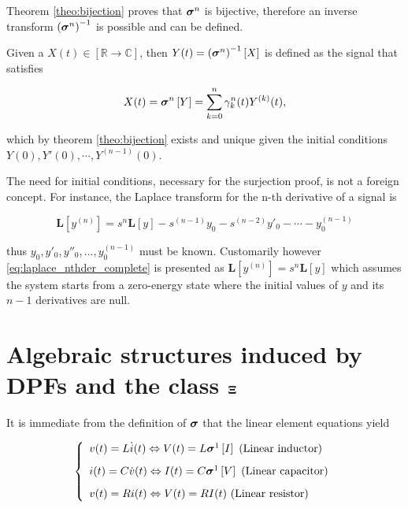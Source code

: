 	Theorem \ref{theo:bijection} proves that $\boldsymbol{\sigma}^{n}$ is bijective, therefore an inverse transform $\left(\boldsymbol{\sigma}^{n}\right)^{-1}$ is possible and can be defined.

\begin{corollary}\label{def:inverse} %
	Given a $X(t)\in\left[\mathbb{R}\to\mathbb{C}\right]$, then $Y(t) = \left(\boldsymbol{\sigma}^{n}\right)^{-1}\left[X\right]$ is defined as the signal that satisfies

\begin{equation} X(t) = \boldsymbol{\sigma}^{n}\left[Y\right] = \sum_{k=0}^n \gamma_k^n (t) Y^{(k)}(t), \end{equation}

	\noindent which by theorem \ref{theo:bijection} exists and unique given the initial conditions $Y(0),Y'(0),\cdots ,Y^{(n-1)}(0)$.
\end{corollary}%

 The need for initial conditions, necessary for the surjection proof, is not a foreign concept. For instance, the Laplace transform for the n-th derivative of a signal is
	
\begin{equation} \mathbf{L}\left[y^{(n)}\right] = s^n \mathbf{L}\left[y\right] - s^{(n-1)}y_0 - s^{(n-2)}y'_0 - \cdots - y^{(n-1)}_0 \label{eq:laplace_nthder_complete} \end{equation}

	\noindent thus $y_0, y'_0, y''_0,...,y^{(n-1)}_0$ must be known. Customarily however \eqref{eq:laplace_nthder_complete} is presented as $\mathbf{L}\left[y^{(n)}\right] = s^n \mathbf{L}\left[y\right]$ which assumes the system starts from a zero-energy state where the initial values of $y$ and its $n-1$ derivatives are null.

\section{Algebraic structures induced by DPFs and the class $\boldsymbol{\Xi}$} \label{subsec:notation_abuse} %
	
	It is immediate from the definition of $\boldsymbol{\sigma}$ that the linear element equations yield

\begin{equation}\left\{\begin{array}{l} v(t) = L\dot{i}(t) \Leftrightarrow V(t) = L \boldsymbol{\sigma}^{1} \left[I\right] \text{ (Linear inductor)}\\[3mm] i(t) = C\dot{v}(t) \Leftrightarrow I(t) = C \boldsymbol{\sigma}^{1} \left[V\right]  \text{ (Linear capacitor)}\\[3mm] v(t) = Ri(t) \Leftrightarrow V(t) = RI(t) \text{ (Linear resistor)}\end{array} \right. \label{sys:dpo_impedances_first}\end{equation}


